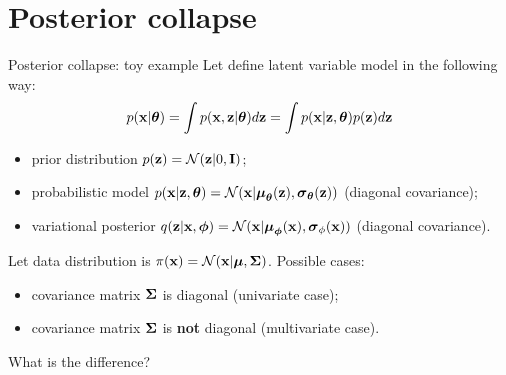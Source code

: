 \section{Posterior collapse}
\begin{frame}{Posterior collapse: toy example}
	Let define latent variable model in the following way:
	\[
	p(\mathbf{x} | \boldsymbol{\theta}) = \int p(\mathbf{x}, \mathbf{z} | \boldsymbol{\theta}) d \mathbf{z} = \int p(\mathbf{x} | \mathbf{z}, \boldsymbol{\theta}) p(\mathbf{z}) d \mathbf{z} 
	\]
	\begin{itemize}
		\item prior distribution $p(\mathbf{z}) = \mathcal{N}(\mathbf{z}| 0, \mathbf{I})$;
		\item probabilistic model $p(\mathbf{x} | \mathbf{z}, \boldsymbol{\theta}) = \mathcal{N}(\mathbf{x} | \boldsymbol{\mu}_{\boldsymbol{\theta}}(\mathbf{z}), \boldsymbol{\sigma}_{\boldsymbol{\theta}}(\mathbf{z}))$ (diagonal covariance);
		\item variational posterior $q(\mathbf{z} | \mathbf{x}, \boldsymbol{\phi}) =  \mathcal{N}(\mathbf{x} | \boldsymbol{\mu}_{\boldsymbol{\phi}}(\mathbf{x}), \boldsymbol{\sigma}_{\phi}(\mathbf{x}))$  (diagonal covariance).
	\end{itemize}
	
	Let data distribution is $\pi(\mathbf{x}) = \mathcal{N}(\mathbf{x} | \boldsymbol{\mu}, \boldsymbol{\Sigma})$. Possible cases:
	\begin{itemize}
		\item covariance matrix $\boldsymbol{\Sigma}$ is diagonal (univariate case);
		\item covariance matrix $\boldsymbol{\Sigma}$ is \textbf{not} diagonal (multivariate case).
	\end{itemize}
	What is the difference?
\end{frame}
